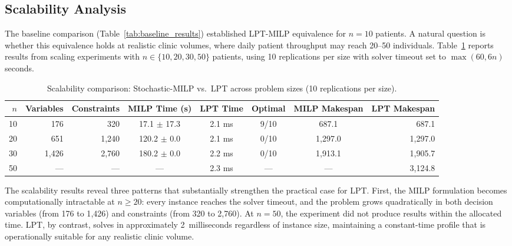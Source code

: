 \documentclass[11pt,a4paper]{article}
\begin{document}
\subsection{Scalability Analysis}
\label{sec:scalability}

The baseline comparison (Table~\ref{tab:baseline_results}) established LPT-MILP equivalence for $n = 10$ patients. A natural question is whether this equivalence holds at realistic clinic volumes, where daily patient throughput may reach 20--50 individuals. Table~\ref{tab:scalability} reports results from scaling experiments with $n \in \{10, 20, 30, 50\}$ patients, using 10 replications per size with solver timeout set to $\max(60, 6n)$ seconds.
\begin{table}[H]
\centering
\caption{Scalability comparison: Stochastic-MILP vs.\ LPT across problem sizes (10 replications per size).}
\label{tab:scalability}
\begin{tabular}{@{}rrrccccr@{}}
\toprule
$n$ & Variables & Constraints & MILP Time (s) & LPT Time & Optimal & MILP Makespan & LPT Makespan \\
\midrule
10 & 176 & 320 & 17.1 $\pm$ 17.3 & 2.1 ms & 9/10 & 687.1 & 687.1 \\
20 & 651 & 1{,}240 & 120.2 $\pm$ 0.0 & 2.1 ms & 0/10 & 1{,}297.0 & 1{,}297.0 \\
30 & 1{,}426 & 2{,}760 & 180.2 $\pm$ 0.0 & 2.2 ms & 0/10 & 1{,}913.1 & 1{,}905.7 \\
50 & --- & --- & --- & 2.3 ms & --- & --- & 3{,}124.8 \\
\bottomrule
\end{tabular}
\end{table}

The scalability results reveal three patterns that substantially strengthen the practical case for LPT. First, the MILP formulation becomes computationally intractable at $n \geq 20$: every instance reaches the solver timeout, and the problem grows quadratically in both decision variables (from 176 to 1{,}426) and constraints (from 320 to 2{,}760). At $n = 50$, the experiment did not produce results within the allocated time. LPT, by contrast, solves in approximately 2~milliseconds regardless of instance size, maintaining a constant-time profile that is operationally suitable for any realistic clinic volume.
\end{document}
